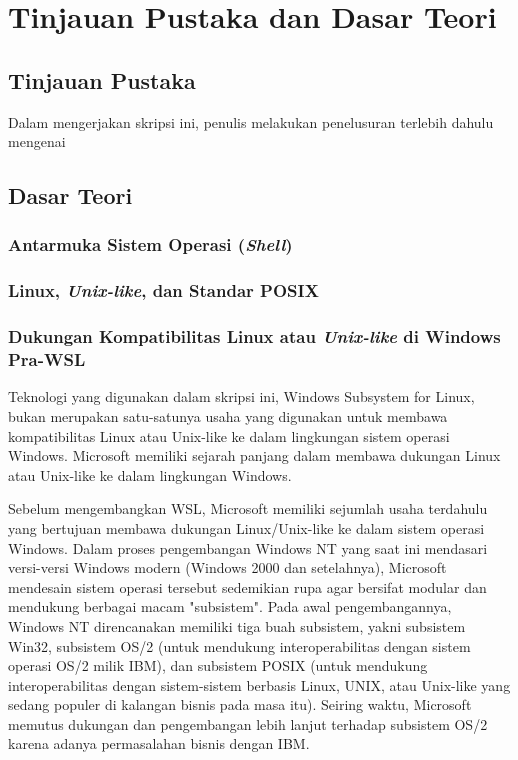\chapter{Tinjauan Pustaka dan Dasar Teori}

\section{Tinjauan Pustaka}

Dalam mengerjakan skripsi ini, penulis melakukan penelusuran terlebih dahulu mengenai 

\section{Dasar Teori}

\subsection{Antarmuka Sistem Operasi (\textit{Shell})}

\subsection{Linux, \textit{Unix-like}, dan Standar POSIX}

\subsection{Dukungan Kompatibilitas Linux atau \textit{Unix-like} di Windows Pra-WSL}

Teknologi yang digunakan dalam skripsi ini, Windows Subsystem for Linux, bukan merupakan satu-satunya usaha yang digunakan untuk membawa kompatibilitas Linux atau Unix-like ke dalam lingkungan sistem operasi Windows. Microsoft memiliki sejarah panjang dalam membawa dukungan Linux atau Unix-like ke dalam lingkungan Windows.

Sebelum mengembangkan WSL, Microsoft memiliki sejumlah usaha terdahulu yang bertujuan membawa dukungan Linux/Unix-like ke dalam sistem operasi Windows. Dalam proses pengembangan Windows NT yang saat ini mendasari versi-versi Windows modern (Windows 2000 dan setelahnya), Microsoft mendesain sistem operasi tersebut sedemikian rupa agar bersifat modular dan mendukung berbagai macam "subsistem". Pada awal pengembangannya, Windows NT direncanakan memiliki tiga buah subsistem, yakni subsistem Win32, subsistem OS/2 (untuk mendukung interoperabilitas dengan sistem operasi OS/2 milik IBM), dan subsistem POSIX (untuk mendukung interoperabilitas dengan sistem-sistem berbasis Linux, UNIX, atau Unix-like yang sedang populer di kalangan bisnis pada masa itu). Seiring waktu, Microsoft memutus dukungan dan pengembangan lebih lanjut terhadap subsistem OS/2 karena adanya permasalahan bisnis dengan IBM.

